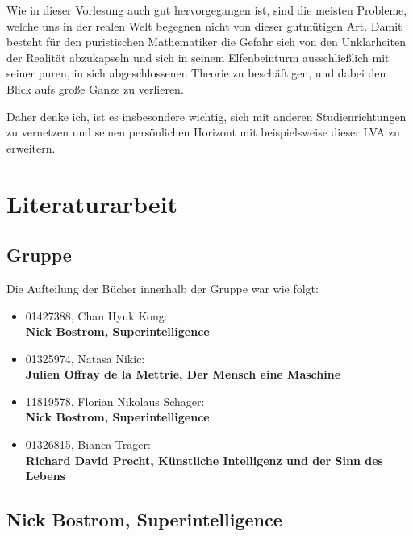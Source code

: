 \documentclass[twoside, a4paper, DIV=11, open=any, bibliography=totoc]{scrbook}
\begin{document}
Wie in dieser Vorlesung auch gut hervorgegangen ist, sind die meisten Probleme,
welche uns in der realen Welt begegnen nicht von dieser gutmütigen Art.
Damit besteht für den puristischen Mathematiker die Gefahr sich von den
Unklarheiten der Realität abzukapseln und sich in seinem Elfenbeinturm
ausschließlich mit seiner puren, in sich abgeschlossenen Theorie zu beschäftigen, und dabei den Blick aufs große Ganze zu verlieren.

Daher denke ich, ist es insbesondere wichtig, sich mit anderen Studienrichtungen
zu vernetzen und seinen persönlichen Horizont mit beispielsweise dieser LVA zu erweitern.
\chapter{Literaturarbeit} \label{chp:LitKrit}

\section{Gruppe} \label{sec:litgroup}

Die Aufteilung der Bücher innerhalb der Gruppe war wie folgt:

\begin{itemize}
    \item 01427388, Chan Hyuk Kong: \\ \textbf {Nick Bostrom, Superintelligence}
    \cite{B2}
    \item 01325974, Natasa Nikic: \\ \textbf {Julien Offray de la Mettrie, Der Mensch eine Maschine} \cite{B1}
    \item 11819578,  Florian Nikolaus Schager: \\ \textbf {Nick Bostrom, Superintelligence} \cite{B2}
    \item 01326815, Bianca Träger:  \\ \textbf {Richard David Precht, Künstliche Intelligenz und der Sinn des Lebens} \cite{B3}
\end{itemize}


\section{Nick Bostrom, Superintelligence} \label{sec:litb1}
\end{document}
